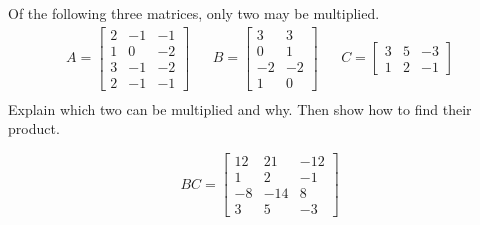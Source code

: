 
\begin{exerciseStatement}


Of the following three matrices, only two may be multiplied. 
\begin{align*} A= \left[\begin{array}{ccc}
2 & -1 & -1 \\
1 & 0 & -2 \\
3 & -1 & -2 \\
2 & -1 & -1
\end{array}\right]  & & B= \left[\begin{array}{cc}
3 & 3 \\
0 & 1 \\
-2 & -2 \\
1 & 0
\end{array}\right]  & & C= \left[\begin{array}{ccc}
3 & 5 & -3 \\
1 & 2 & -1
\end{array}\right]  \\ \end{align*}
             Explain which two can be multiplied and why. Then show how to find their product.


\end{exerciseStatement}
    
\begin{exerciseAnswer} 
\[BC= \left[\begin{array}{ccc}
12 & 21 & -12 \\
1 & 2 & -1 \\
-8 & -14 & 8 \\
3 & 5 & -3
\end{array}\right] \]
\end{exerciseAnswer}
    
